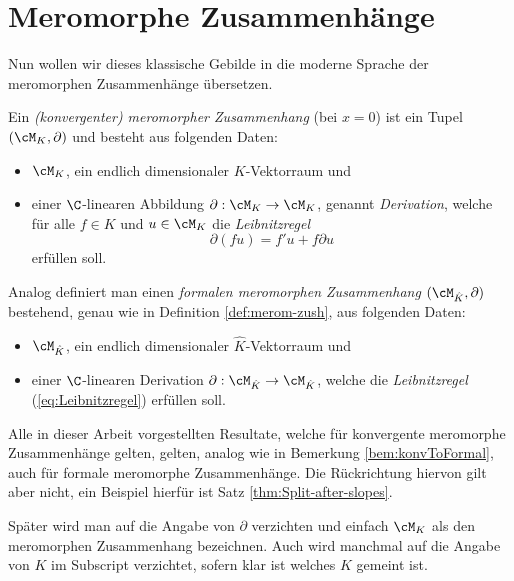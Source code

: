 \section{Meromorphe Zusammenhänge}
Nun wollen wir dieses klassische Gebilde in die moderne Sprache der
meromorphen Zusammenhänge übersetzen.
\begin{defn} \label{def:merom-zush}
Ein \emph{(konvergenter) meromorpher Zusammenhang} (bei $x=0$) ist ein Tupel
$(\cM_K,\partial)$ und besteht aus folgenden Daten:
\begin{itemize}
\item $\cM_K$, ein endlich dimensionaler $K$-Vektorraum und
\item einer $\C$-linearen Abbildung $\partial:\cM_K\rightarrow \cM_K$,
genannt \emph{Derivation}, welche für alle $f\in K$
und $u\in \cM_K$ die \emph{Leibnitzregel}
\begin{equation}\label{eq:Leibnitzregel}
\partial(fu)=f'u+f\partial u
\end{equation}
erfüllen soll.
\end{itemize}
\end{defn}
\begin{comment}
\begin{bem}
In \cite{sabbah_cimpa90} wird in die Zweite Stelle des Tupels ein Zusammenhang
$\nabla$ geschrieben, in welchen ein Vektorfeld von $K$ eingesetzt wird.
Es gilt, ... TODO
\end{bem}
\end{comment}
\begin{bem} %
Analog definiert man einen \emph{formalen meromorphen Zusammenhang}
$(\cM_{\hat K},\partial)$ bestehend, genau wie in Definition
\ref{def:merom-zush}, aus folgenden Daten:
\begin{itemize}
\item $\cM_{\hat K}$, ein endlich dimensionaler $\hat K$-Vektorraum und
\item einer $\C$-linearen Derivation $\partial:\cM_{\hat K}\rightarrow
\cM_{\hat K}$, welche die \emph{Leibnitzregel} (\ref{eq:Leibnitzregel})
erfüllen soll.
\end{itemize}
\end{bem}

\begin{bem}
Alle in dieser Arbeit vorgestellten Resultate, welche für konvergente
meromorphe Zusammenhänge gelten, gelten, analog wie in Bemerkung
\ref{bem:konvToFormal}, auch für formale meromorphe Zusammenhänge.
Die Rückrichtung hiervon gilt aber nicht, ein Beispiel hierfür ist Satz
\ref{thm:Split-after-slopes}.
\end{bem}
\begin{bem}
Später wird man auf die Angabe von $\partial$ verzichten und einfach
$\cM_K$ als den meromorphen Zusammenhang bezeichnen. Auch wird manchmal auf die
Angabe von $K$ im Subscript verzichtet, sofern klar ist welches $K$ gemeint
ist.
\end{bem}

